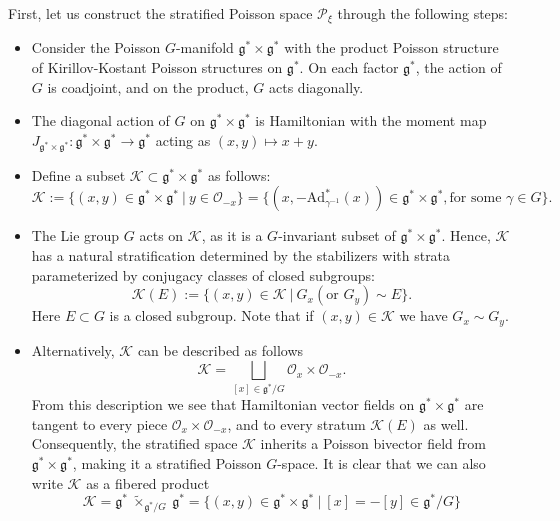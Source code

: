 \documentclass[12pt]{amsart}
\theoremstyle{definition}
\numberwithin{equation}{section}
\newcommand{\gstar}{\mathfrak{g}^*}
\newcommand{\SET}[1]{\{#1\}}
\newcommand{\Pxi}{\mathcal{P}_{\xi}}
\newcommand{\Adjointaction}{\mathrm{Ad}}
\newcommand{\middleK}{\mathcal{K}}
\begin{document}
	First, let us construct the stratified Poisson space $\Pxi$ through the following steps:
	\begin{itemize}
		
		\item[(1)] Consider the Poisson $G$-manifold $\gstar \times \gstar$ with the product Poisson structure of  Kirillov-Kostant Poisson structures on $\gstar$. On each factor $\gstar$, the action of $G$ is coadjoint, and on the product, $G$ acts diagonally.
		
		\item[(2)] The diagonal action of $G$ on $\gstar \times \gstar$ is Hamiltonian with the 
		moment map $J_{\gstar \times \gstar}: \gstar \times \gstar \to \gstar$ acting as $(x,y)\mapsto x+y$.
		
		\item[(3)] Define a subset $\middleK \subset \gstar \times \gstar$ as follows:
		$$
		\middleK := \SET{(x, y) \in \gstar \times \gstar ~|~ y \in \mathcal{O}_{-x}} = \SET{(x, -\Adjointaction^*_{\gamma^{-1}}(x)) \in \gstar \times \gstar, \text{for some } \gamma \in G}.
		$$
		
		\item[(4)]The Lie group $G$ acts on $\middleK$,  as it is a $G$-invariant subset of $\gstar \times \gstar$. Hence, $\middleK$ has a natural stratification determined by the stabilizers with strata parameterized by conjugacy classes of closed subgroups: 
		$$
		\middleK(E) := \SET{(x, y) \in \middleK ~|~ G_x (\text{or } G_y) \sim E}.
		$$
		Here $E \subset G$ is a closed subgroup. Note that if $(x,y)\in \middleK$ we have $G_x\sim G_y$. 

		
		\item[(5)] Alternatively,  $\middleK$ can be described as follows
		$$
		\middleK = \bigsqcup_{[x] \in \gstar/G} \mathcal{O}_x \times \mathcal{O}_{-x}.
		$$
		From this description we see that Hamiltonian vector fields on $\gstar \times \gstar$ are tangent to every piece $\mathcal{O}_x \times \mathcal{O}_{-x}$, and to every stratum  $\middleK(E)$ as well. Consequently, the stratified space $\middleK$ inherits a Poisson bivector field from $\gstar \times \gstar$, making it a stratified Poisson $G$-space.
		It is clear that we can also write $\middleK$ as a fibered product
		\[
		\middleK =\gstar ~\tilde{\times}_{\gstar/G}~\gstar=\{(x,y)\in \gstar\times \gstar ~|~ [x]=-[y]\in \gstar/G\}
		\]
		

\end{itemize}
\end{document}
